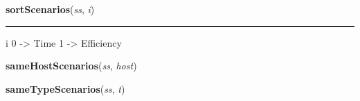     \label{scenarios:sortScenarios}

    \vspace{0.5ex}

\hspace{.8\funcindent}\begin{boxedminipage}{\funcwidth}

    \raggedright \textbf{sortScenarios}(\textit{ss}, \textit{i})

    \vspace{-1.5ex}

    \rule{\textwidth}{0.5\fboxrule}
\setlength{\parskip}{2ex}
    i 0 -{\textgreater} Time 1 -{\textgreater} Efficiency

\setlength{\parskip}{1ex}
    \end{boxedminipage}

    \label{scenarios:sameHostScenarios}

    \vspace{0.5ex}

\hspace{.8\funcindent}\begin{boxedminipage}{\funcwidth}

    \raggedright \textbf{sameHostScenarios}(\textit{ss}, \textit{host})

\setlength{\parskip}{2ex}
\setlength{\parskip}{1ex}
    \end{boxedminipage}

    \label{scenarios:sameTypeScenarios}

    \vspace{0.5ex}

\hspace{.8\funcindent}\begin{boxedminipage}{\funcwidth}

    \raggedright \textbf{sameTypeScenarios}(\textit{ss}, \textit{t})

\setlength{\parskip}{2ex}
\setlength{\parskip}{1ex}
    \end{boxedminipage}

    \label{scenarios:filterScenariosByHostsPerSubmodel}

    \vspace{0.5ex}

